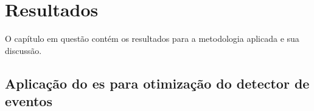 \chapter{Resultados}
\label{chap:resultados}

O capítulo em questão contém os resultados para a metodologia aplicada
e sua discussão.

%
%
%
%


\section[Aplicação do ES para otimização do detector de eventos]{
Aplicação do \acf{es} para otimização do detector de eventos}
\label{sec:aplic_es}




